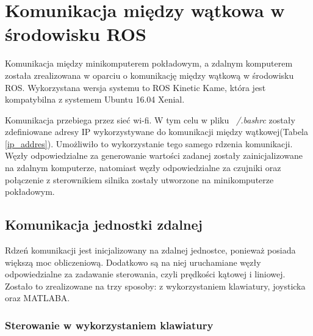 \chapter{Komunikacja między wątkowa w środowisku ROS}

Komunikacja między minikomputerem pokładowym, a zdalnym komputerem została zrealizowana w oparciu o komunikację między wątkową w środowisku ROS. Wykorzystana wersja systemu to ROS Kinetic Kame, która jest kompatybilna z systemem Ubuntu 16.04 Xenial.

Komunikacja przebiega przez sieć wi-fi. W tym celu w pliku \textit{~/.bashrc} zostały zdefiniowane adresy IP wykorzystywane do komunikacji między wątkowej(Tabela \ref{ip_addres}). Umożliwiło to wykorzystanie tego samego rdzenia komunikacji. Węzły odpowiedzialne za generowanie wartości zadanej zostały zainicjalizowane na zdalnym komputerze, natomiast węzły odpowiedzialne za czujniki oraz połączenie z sterownikiem silnika zostały utworzone na minikomputerze pokładowym.



\begin{table}[h]
	\centering
	\caption{Definicja adresów wykorzystywanych przez ROS.}
	\label{ip_addres}
\end{table}

\section{Komunikacja jednostki zdalnej}
Rdzeń komunikacji jest inicjalizowany na zdalnej jednostce, ponieważ posiada większą moc obliczeniową. Dodatkowo są na niej uruchamiane węzły odpowiedzialne za zadawanie sterowania, czyli prędkości kątowej i liniowej. Zostało to zrealizowane na trzy sposoby: z wykorzystaniem klawiatury, joysticka oraz MATLABA.

\subsection{Sterowanie w wykorzystaniem klawiatury}

